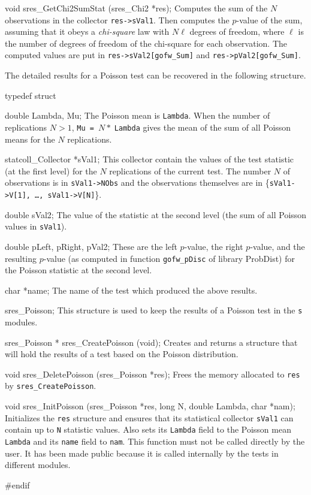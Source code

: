 void sres_GetChi2SumStat (sres_Chi2 *res);
\endcode
 \tab
  Computes the sum of the $N$ observations in the collector {\tt res->sVal1}.
  Then computes the $p$-value of the sum, assuming that it obeys a
  {\em chi-square\/} law with $N\ell$ degrees of freedom, where $\ell$ is the
  number of degrees of freedom of the chi-square for each observation.
  The computed values are put in {\tt res->sVal2[gofw\_Sum]} and
  {\tt res->pVal2[gofw\_Sum]}.
 \endtab





The detailed results for a Poisson test can be recovered in the
following structure.

\code

typedef struct {

   double Lambda, Mu;
\endcode
 \tabb
  The Poisson mean is {\tt Lambda}. When the number of replications
  $N>1$, {\tt Mu = $N*\;$Lambda} gives the mean of the sum of all
  Poisson means for the $N$ replications.
 \endtabb
\code

   statcoll_Collector *sVal1;
\endcode
 \tabb
  This collector contain the values of the test statistic
  (at the first level) for the $N$ replications of the current
  test. The number $N$ of observations is in {\tt sVal1->NObs} and the
  observations themselves are in \{{\tt sVal1->V[1], \ldots, sVal1->V[N]}\}.
 \endtabb
\code

   double sVal2;
\endcode
 \tabb
  The value of the statistic at the second level
  (the sum of all Poisson values in  {\tt sVal1}).
 \endtabb
\code

   double pLeft, pRight, pVal2;
\endcode
 \tabb
  These are the left $p$-value, the right $p$-value, and the resulting
  $p$-value (as computed in function {\tt gofw\_pDisc} of library
  ProbDist) for the Poisson statistic at the second level.
 \endtabb
\code

   char *name;
\endcode
 \tabb
  The name of the test which produced the above results.
 \endtabb
\code

} sres_Poisson;
\endcode
 \tab
  This structure is used to keep the results of a Poisson
  test in the {\tt s} modules.
 \endtab
\code


sres_Poisson * sres_CreatePoisson (void);
\endcode
 \tab
  Creates and returns a structure that will hold the results
  of a test based on the Poisson distribution.
 \endtab
\code


void sres_DeletePoisson (sres_Poisson *res);
\endcode
 \tab
  Frees the memory allocated to {\tt res} by {\tt sres\_CreatePoisson}.
 \endtab
\code


void sres_InitPoisson (sres_Poisson *res, long N, double Lambda, char *nam);
\endcode
 \tab
   Initializes the {\tt res} structure and ensures that its statistical
   collector {\tt sVal1} can contain up to  {\tt N} statistic values.
   Also sets its {\tt Lambda} field to the Poisson mean {\tt Lambda} and
   its  {\tt name} field to  {\tt nam}. This function must not be called
   directly by the user. It has been made public because it is called
   internally by the tests in different modules.
 \endtab

\code
\hide
#endif
\endhide
\endcode
